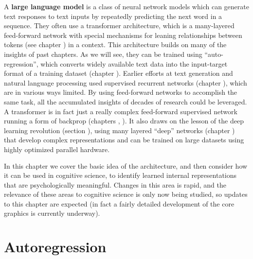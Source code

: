 A \textbf{large language model} is a class of neural network models which can generate text responses to text inputs by repeatedly predicting the next word in a sequence. They often use a transformer architecture, which is a many-layered feed-forward network with special mechanisms for leaning relationships between tokens (see chapter ) in a context. This architecture builds on many of the insights of past chapters. As we will see, they can be trained using ``auto-regression'', which converts widely available text data into the input-target format of a training dataset (chapter ). Earlier efforts at text generation and natural language processing used supervised recurrent networks (chapter ), which are in various ways limited. By using feed-forward networks to accomplish the same task, all the accumulated insights of decades of research could be leveraged. A transformer is in fact just a really complex feed-forward supervised network running a form of backprop (chapters , ). It also draws on the lesson of the deep learning revolution (section ), using many layered ``deep'' networks (chapter ) that develop complex representations and can be trained on large datasets using highly optimized parallel hardware.


In this chapter we cover the basic idea of the architecture, and then consider how it can be used in cognitive science, to identify learned internal representations that are psychologically meaningful. Changes in this area is rapid, and the relevance of these areas to cognitive science is only now being studied, so updates to this chapter are expected (in fact a fairly detailed development of the core graphics is currently underway).

\section{Autoregression}

